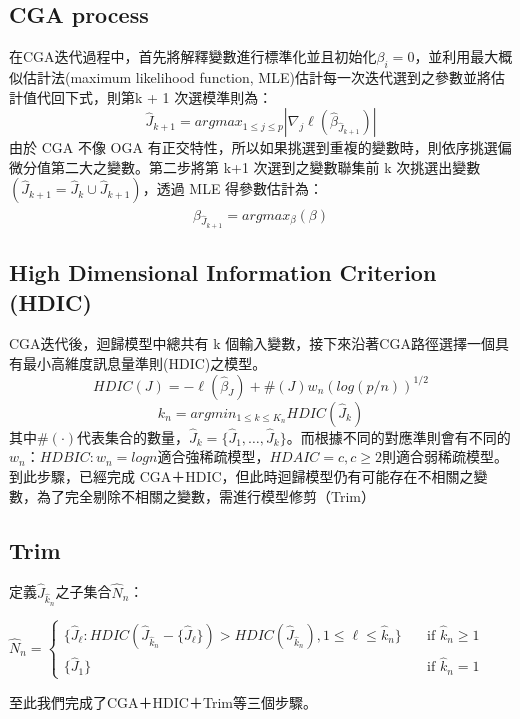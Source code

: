 \subsection{CGA process}
在CGA迭代過程中，首先將解釋變數進行標準化並且初始化$\beta_{i}=0$，並利用最大概似估計法(maximum likelihood function, MLE)估計每一次迭代選到之參數並將估計值代回下式，則第k + 1 次選模準則為：
\begin{equation}
\hat{J}_{k+1} = argmax_{1 \leq j \leq p}|\nabla_j\ell(\hat{\beta}_{\hat{J}_{k+1}})|
\end{equation}
由於 CGA 不像 OGA 有正交特性，所以如果挑選到重複的變數時，則依序挑選偏微分值第二大之變數。第二步將第 k+1 次選到之變數聯集前 k 次挑選出變數 $(\hat{J}_{k+1} = \hat{J}_{k} \cup \hat{J}_{k+1})$，透過 MLE 得參數估計為：
\begin{equation}
\hat{\beta}_{\hat{J}_{k+1}} = argmax_{\beta}(\beta)
\end{equation}


\subsection{High Dimensional Information Criterion (HDIC)}
CGA迭代後，迴歸模型中總共有 k 個輸入變數，接下來沿著CGA路徑選擇一個具有最小高維度訊息量準則(HDIC)之模型。
\begin{equation}
HDIC(J) = -\ell(\hat{\beta}_J)+\#(J)w_n(log(p/n))^{1/2}
\end{equation}
\begin{equation}
k_n = argmin_{1\leq k \leq K_n}HDIC(\hat{J}_k)
\end{equation}
其中$\#(\cdot)$代表集合的數量，$\hat{J}_{k}=\{\hat{J}_1,\ldots,\hat{J}_k\}$。而根據不同的對應準則會有不同的$w_{n}$：$HDBIC:w_{n}=logn$適合強稀疏模型，$HDAIC = c, c \geq 2$則適合弱稀疏模型。到此步驟，已經完成 CGA＋HDIC，但此時迴歸模型仍有可能存在不相關之變數，為了完全剔除不相關之變數，需進行模型修剪（Trim）
\subsection{Trim}
定義$\hat{J}_{\hat{k}_n}$之子集合$\hat{N}_{n}$：\\
\begin{center}
$\displaystyle
\hat{N}_{n} = 
\begin{cases}
\{\hat{J}_\ell:HDIC(\hat{J}_{\hat{k}_n}-\{\hat{J}_\ell\})>HDIC(\hat{J}_{\hat{k}_n}), 1 \leq \ell \leq \hat{k}_n\} & \quad \text{if } \hat{k}_n \geq 1 \\
\{\hat{J}_1\} & \quad \text{if } \hat{k}_n = 1
\end{cases}
$
\end{center}
至此我們完成了CGA＋HDIC＋Trim等三個步驟。
\\[2ex]

